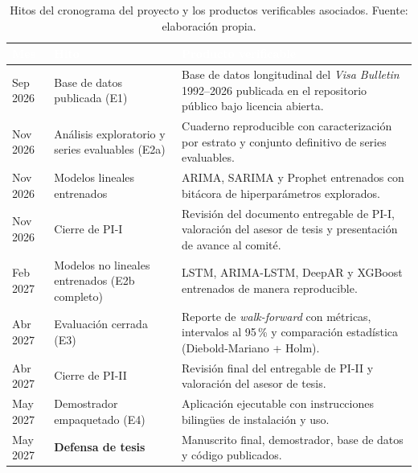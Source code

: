 \documentclass[12pt,letterpaper]{report}
\begin{document}
\begin{table}[H]
    \centering
    \footnotesize
    \setlength{\arrayrulewidth}{0.7pt}
    \setlength{\tabcolsep}{4pt}
    \begin{tabular}{>{\raggedright\arraybackslash}p{2.0cm}
                    >{\raggedright\arraybackslash}p{4.0cm}
                    >{\raggedright\arraybackslash}p{6.4cm}}
        \hline
        \rowcolor{uacjblue!85}
        \textcolor{white}{\textbf{Mes}} &
        \textcolor{white}{\textbf{Hito}} &
        \textcolor{white}{\textbf{Producto verificable}} \\
        \hline
        \rowcolor{uacjblue!4}
        Sep 2026 & Base de datos publicada (E1) & Base de datos longitudinal del \textit{Visa Bulletin} 1992--2026 publicada en el repositorio público bajo licencia abierta. \\
        Nov 2026 & Análisis exploratorio y series evaluables (E2a) & Cuaderno reproducible con caracterización por estrato y conjunto definitivo de series evaluables. \\
        \rowcolor{uacjblue!4}
        Nov 2026 & Modelos lineales entrenados & ARIMA, SARIMA y Prophet entrenados con bitácora de hiperparámetros explorados. \\
        Nov 2026 & Cierre de PI-I & Revisión del documento entregable de PI-I, valoración del asesor de tesis y presentación de avance al comité. \\
        \rowcolor{uacjblue!4}
        Feb 2027 & Modelos no lineales entrenados (E2b completo) & LSTM, ARIMA-LSTM, DeepAR y XGBoost entrenados de manera reproducible. \\
        Abr 2027 & Evaluación cerrada (E3) & Reporte de \textit{walk-forward} con métricas, intervalos al 95\,\% y comparación estadística (Diebold-Mariano + Holm). \\
        \rowcolor{uacjblue!4}
        Abr 2027 & Cierre de PI-II & Revisión final del entregable de PI-II y valoración del asesor de tesis. \\
        May 2027 & Demostrador empaquetado (E4) & Aplicación ejecutable con instrucciones bilingües de instalación y uso. \\
        \rowcolor{uacjblue!4}
        May 2027 & \textbf{Defensa de tesis} & Manuscrito final, demostrador, base de datos y código publicados. \\
        \hline
    \end{tabular}
    \caption[Hitos del cronograma con sus productos verificables.]{Hitos del cronograma del proyecto y los productos verificables asociados. Fuente: elaboración propia.}
    \label{tab:hitos_visapredict}
\end{table}
\end{document}
